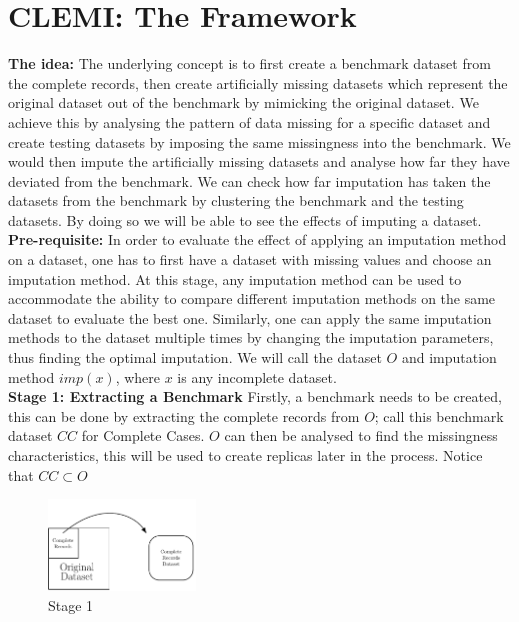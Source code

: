 \documentclass[conference,compsoc]{IEEEtran}
\begin{document}
	\section{CLEMI: The Framework} %
	\label{sec:proposed_framework}
		\textbf{The idea:} The underlying concept is to first create a benchmark dataset from the complete records, then create artificially missing datasets which represent the original dataset out of the benchmark by mimicking the original dataset. We achieve this by analysing the pattern of data missing for a specific dataset and create testing datasets by imposing the same missingness into the benchmark. We would then impute the artificially missing datasets and analyse how far they have deviated from the benchmark. We can check how far imputation has taken the datasets from the benchmark by clustering the benchmark and the testing datasets. By doing so we will be able to see the effects of imputing a dataset. 
		\\
		\indent \textbf{Pre-requisite:}
		In order to evaluate the effect of applying an imputation method on a dataset, one has to first have a dataset with missing values and choose an imputation method. At this stage, any imputation method can be used to accommodate the ability to compare different imputation methods on the same dataset to evaluate the best one. Similarly, one can apply the same imputation methods to the dataset multiple times by changing the imputation parameters, thus finding the optimal imputation. We will call the dataset $O$ and imputation method $imp(x)$, where $x$ is any incomplete dataset.
		\\
		\indent \textbf{Stage 1: Extracting a Benchmark}
		Firstly, a benchmark needs to be created, this can be done by extracting the complete records from $O$; call this benchmark dataset $CC$ for Complete Cases. $O$ can then be analysed to find the missingness characteristics, this will be used to create replicas later in the process. Notice that $ CC \subset O$ 
		\begin{figure}[!ht]
			\caption{Stage 1}
			\centering
			\includegraphics[width=0.35\textwidth]{stage1.pdf}
		\end{figure}
		\\
\end{document}
